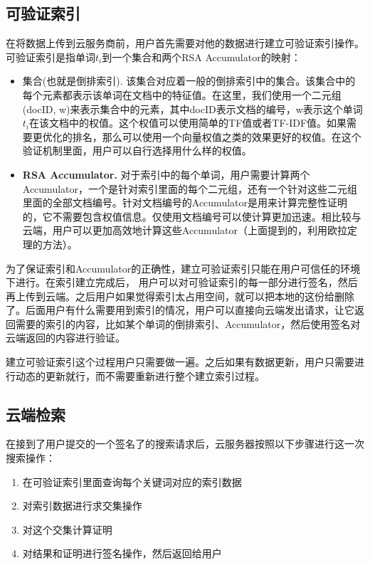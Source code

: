 \subsection{可验证索引}
在将数据上传到云服务商前，用户首先需要对他的数据进行建立可验证索引操作。可验证索引是指单词$t_i$到一个集合和两个RSA Accumulator的映射：
\begin{itemize}
\item 集合(也就是倒排索引). 该集合对应着一般的倒排索引中的集合。该集合中的每个元素都表示该单词在文档中的特征值。在这里，我们使用一个二元组(docID, w)来表示集合中的元素，其中docID表示文档的编号，w表示这个单词$t_i$在该文档中的权值。这个权值可以使用简单的TF值或者TF-IDF值。如果需要更优化的排名，那么可以使用一个向量权值之类的效果更好的权值。在这个验证机制里面，用户可以自行选择用什么样的权值。
\item \textbf{RSA Accumulator.} 对于索引中的每个单词，用户需要计算两个Accumulator，一个是针对索引里面的每个二元组，还有一个针对这些二元组里面的全部文档编号。针对文档编号的Accumulator是用来计算完整性证明的，它不需要包含权值信息。仅使用文档编号可以使计算更加迅速。相比较与云端，用户可以更加高效地计算这些Accumulator（上面提到的，利用欧拉定理的方法）。
\end{itemize}

为了保证索引和Accumulator的正确性，建立可验证索引只能在用户可信任的环境下进行。在索引建立完成后， 用户可以对可验证索引的每一部分进行签名，然后再上传到云端。之后用户如果觉得索引太占用空间，就可以把本地的这份给删除了。后面用户有什么需要用到索引的情况，用户可以直接向云端发出请求，让它返回需要的索引的内容，比如某个单词的倒排索引、Accumulator，然后使用签名对云端返回的内容进行验证。

建立可验证索引这个过程用户只需要做一遍。之后如果有数据更新，用户只需要进行动态的更新就行，而不需要重新进行整个建立索引过程。

\subsection{云端检索}
在接到了用户提交的一个签名了的搜索请求后，云服务器按照以下步骤进行这一次搜索操作：
\begin{enumerate}
\item 在可验证索引里面查询每个关键词对应的索引数据
\item 对索引数据进行求交集操作
\item 对这个交集计算证明
\item 对结果和证明进行签名操作，然后返回给用户
\end{enumerate}

